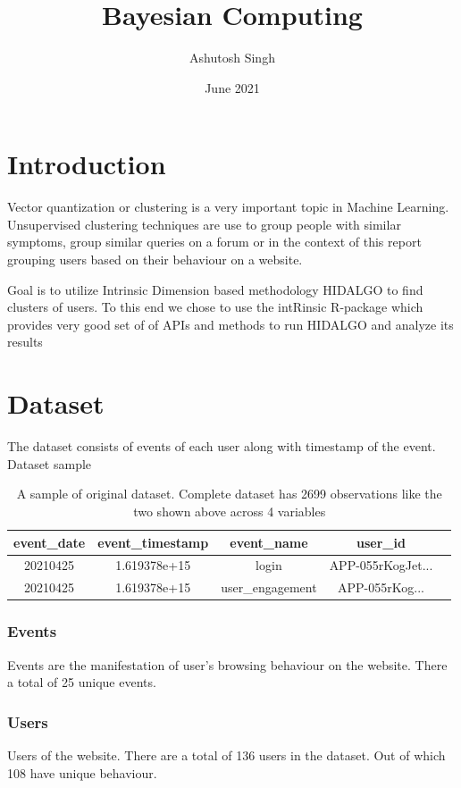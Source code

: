 \documentclass{article}
\title{Bayesian Computing}
\author{Ashutosh Singh}
\date{June 2021}
\begin{document}
\maketitle

\section{Introduction}
Vector quantization or clustering is a very important topic in Machine Learning. Unsupervised clustering techniques are use to group people with similar symptoms, group similar queries on a forum or in the context of this report grouping users based on their behaviour on a website.

Goal is to utilize Intrinsic Dimension based methodology HIDALGO to find clusters of users. To this end we chose to use the intRinsic R-package which provides very good set of of APIs and methods to run HIDALGO and analyze its results


\section{Dataset}
The dataset consists of events of each user along with timestamp of the event. Dataset sample

\begin{table}[ht]
      \centering
      \begin{tabular}{|c | c | c | c | c|}
             \hline
             event\_date & event\_timestamp & event\_name & user\_id\\
             \hline
             \hline
             20210425 & 1.619378e+15 & login & APP-055rKogJet...\\
             \hline
             20210425 & 1.619378e+15 & user\_engagement& APP-055rKog...\\
             \hline
      \end{tabular}
    \caption{A sample of original dataset. Complete dataset has 2699 observations like the two shown above across 4 variables}
    \label{tab:table-name}
 \end{table}
 
\subsubsection{Events}
Events are the manifestation of user's browsing behaviour on the website.
There a total of 25 unique events.

\subsubsection{Users}
Users of the website. There are a total of 136 users in the dataset. Out of which 108 have unique behaviour.
\end{document}

